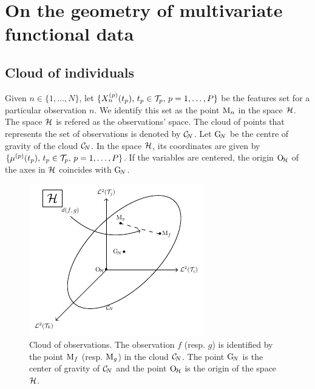 \section{On the geometry of multivariate functional data} %
\label{sec:geometric_point_of_view_mfpca}

\subsection{Cloud of individuals} %
\label{sub:cloud_of_individuals}

Given $n \in \{1, \dots, N\}$, let $\{X_n^{(p)}(t_p),\,t_p \in \mathcal{T}_{p},\,p = 1, \dots, P\}$ be the features set for a particular observation $n$. We identify this set as the point $\mathrm{M}_n$ in the space $\mathcal{H}$. The space $\mathcal{H}$ is refered as the observations' space. The cloud of points that represents the set of observations is denoted by $\mathcal{C}_{\!N}$. Let $\mathrm{G}_{\!N}$ be the centre of gravity of the cloud $\mathcal{C}_{\!N}$. In the space $\mathcal{H}$, its coordinates are given by $\{\mu^{(p)}(t_p),\,t_p \in \mathcal{T}_{p},\,p = 1, \dots, P\}$. If the variables are centered, the origin $\mathrm{O}_{\!\mathcal{H}}$ of the axes in $\mathcal{H}$ coincides with $\mathrm{G}_{\!N}$.

\begin{figure}
    \centering
    \includegraphics[scale=1.2]{figures/cloud_obs.pdf}
    \caption{Cloud of observations. The observation $f$ (resp. $g$) is identified by the point $\mathrm{M}_f$ (resp. $\mathrm{M}_g$) in the cloud $\mathcal{C}_{\!N}$. The point $\mathrm{G}_{\!N}$ is the center of gravity of $\mathcal{C}_{\!N}$ and the point $\mathrm{O}_{\!\mathcal{H}}$ is the origin of the space $\mathcal{H}$.}
    \label{fig:cloud_obs}
\end{figure}

